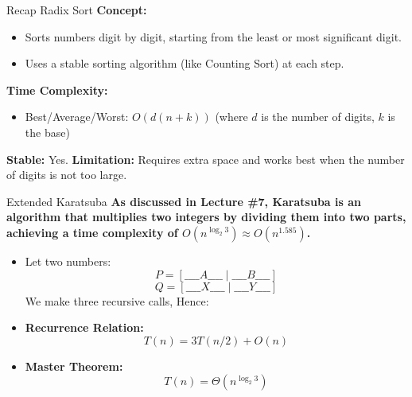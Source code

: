 \documentclass{beamer}
\begin{document}
\begin{frame}{Recap Radix Sort}
    \textbf{Concept:} 
    \begin{itemize}
        \item Sorts numbers digit by digit, starting from the least or most significant digit.
        \item Uses a stable sorting algorithm (like Counting Sort) at each step.
    \end{itemize}
    \textbf{Time Complexity:}
    \begin{itemize}
        \item Best/Average/Worst: $O(d(n + k))$ (where $d$ is the number of digits, $k$ is the base)
    \end{itemize}
    \textbf{Stable:} Yes. \newline
    \textbf{Limitation:} Requires extra space and works best when the number of digits is not too large.
\end{frame}

\begin{frame}{Extended Karatsuba}
    \textbf{As discussed in Lecture \#7, Karatsuba is an algorithm that multiplies two integers by dividing them into two parts, achieving a time complexity of \(O(n^{\log_2 3}) \approx O(n^{1.585})\).}
    
    \begin{itemize}
        \item Let two numbers:
        \[
        P = [\_\_\_\_A\_\_\_\_\mid\_\_\_\_B\_\_\_\_]  
        \]
        \[
        Q = [\_\_\_\_X\_\_\_\_\mid\_\_\_\_Y\_\_\_\_]  
        \]
        We make three recursive calls, Hence:
        \item \textbf{Recurrence Relation:}
        \[
        T(n) = 3T(n/2) + O(n)
        \]
        \item \textbf{Master Theorem:}  
        \[
        T(n) = \Theta(n^{\log_2 3})
        \]
    \end{itemize}
\end{frame}
\end{document}

